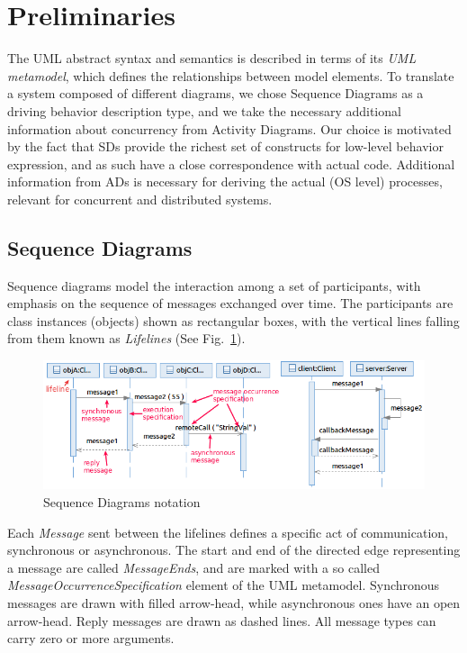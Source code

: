 \documentclass[letter]{llncs}
\newcommand{\figshrink}{\vspace{-.6cm}}
\newcommand{\figshrinkend}{}
\newcommand{\secshrink}{\vspace{-.5cm}}
\newcommand{\secshrinkbegin}{\vspace{-.2cm}}
\newcommand{\subsecshrink}{\vspace{-.5cm}}
\newcommand{\subsecshrinkbegin}{\vspace{-.2cm}}
\begin{document}
\secshrink
\section{Preliminaries}
\label{sec:Preliminaries}
\secshrinkbegin
The UML abstract syntax and semantics is described in terms of its \emph{UML metamodel},
which defines the relationships between model elements.
To translate a system composed of different diagrams, we chose Sequence 
Diagrams as a driving behavior description type, and we take the necessary additional information about concurrency
from Activity Diagrams. Our choice is motivated by the fact that SDs provide the richest set of constructs 
for low-level behavior expression, and as such have a close correspondence with actual code. 
Additional information from ADs is necessary for deriving the actual (OS level) processes,
relevant for concurrent and distributed systems. 
\subsecshrink
\subsection{Sequence Diagrams}
\label{sec:SDs}
\subsecshrinkbegin
Sequence diagrams model the interaction among a set of participants, with emphasis on the sequence of messages exchanged over time. 
The participants are class instances (objects) shown as rectangular boxes, with the vertical lines falling from them
known as \emph{Lifelines} (See Fig.~\ref{fig:example1}). 
\begin{figure}[!t]
\centering
\figshrink
\includegraphics[width=1.0\linewidth,keepaspectratio=true]{./Figure1_new.png}
\caption{Sequence Diagrams notation}
\label{fig:example1}
\end{figure}
Each \emph{Message} sent between the lifelines defines a specific act of communication, synchronous or asynchronous. 
The start and end of the directed edge representing a message are called \emph{MessageEnds}, and are marked with 
a so called \emph{MessageOccurrenceSpecification} element of the UML metamodel.
Synchronous messages are drawn with filled arrow-head, while asynchronous ones have an open arrow-head.
Reply messages are drawn as dashed lines. All message types can carry zero or more arguments.
\end{document}
